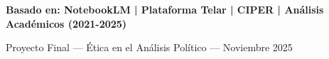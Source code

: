 
\vspace{0.8cm}
\noindent\makebox[\linewidth]{\textcolor{ucred}{\rule{\textwidth}{3pt}}}

\begin{center}
{\fontsize{20}{24}\selectfont \textbf{Basado en: NotebookLM | Plataforma Telar | CIPER | Análisis Académicos (2021-2025)}}

\vspace{0.2cm}

{\fontsize{18}{22}\selectfont Proyecto Final — Ética en el Análisis Político — Noviembre 2025}
\end{center}